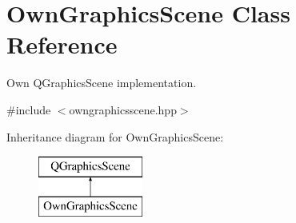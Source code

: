 \hypertarget{classOwnGraphicsScene}{}\section{Own\+Graphics\+Scene Class Reference}
\label{classOwnGraphicsScene}


Own Q\+Graphics\+Scene implementation.  




{\ttfamily \#include $<$owngraphicsscene.\+hpp$>$}

Inheritance diagram for Own\+Graphics\+Scene\+:\begin{figure}[H]
\begin{center}
\leavevmode
\includegraphics[height=2.000000cm]{classOwnGraphicsScene}
\end{center}
\end{figure}
